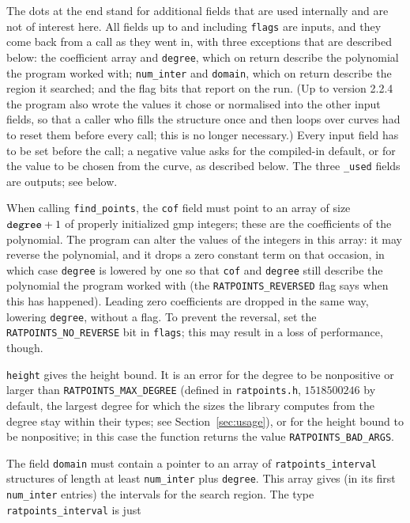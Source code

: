 \documentclass[12pt,a4paper,oneside]{amsart}
\begin{document}
The dots at the end stand for additional fields that are used internally
and are not of interest here. All fields up to and including \texttt{flags}
are inputs, and they come back from a call as they went in, with three
exceptions that are described below: the coefficient array and
\texttt{degree}, which on return describe the polynomial the program
worked with; \texttt{num\_inter} and \texttt{domain}, which on return
describe the region it searched; and the flag bits that report on the
run. (Up to version 2.2.4 the program also wrote the values it chose or
normalised into the other input fields, so that a caller who fills the
structure once and then loops over curves had to reset them before every
call; this is no longer necessary.) Every input field has to be set before
the call; a negative value asks for the compiled-in default, or for the
value to be chosen from the curve, as described below.
The three \texttt{\_used} fields are outputs; see below.

When calling \texttt{find\_points}, the
\texttt{cof} field must point to an array of size $\text{\texttt{degree}} + 1$
of properly initialized gmp integers; these are the coefficients of
the polynomial. The program can alter the values of the integers in this
array: it may reverse the polynomial, and it drops a zero constant term
on that occasion, in which case \texttt{degree} is lowered by one so that
\texttt{cof} and \texttt{degree} still describe the polynomial the program
worked with (the \texttt{RATPOINTS\_REVERSED} flag says when this has
happened). Leading zero coefficients are dropped in the same way, lowering
\texttt{degree}, without a flag.
To prevent the reversal, set the \texttt{RATPOINTS\_NO\_REVERSE} bit
in \texttt{flags}; this may result in a loss of performance, though.

\texttt{height} gives the height bound. It is an error for the
degree to be nonpositive or larger than \texttt{RATPOINTS\_MAX\_DEGREE}
(defined in \texttt{ratpoints.h}, $1518500246$ by default, the largest
degree for which the sizes the library computes from the degree stay
within their types; see Section~\ref{sec:usage}), or for the height
bound to be nonpositive; in this case the function returns the value
\texttt{RATPOINTS\_BAD\_ARGS}.

The field \texttt{domain} must contain a pointer to an array of
\texttt{ratpoints\_interval} structures of length at least \texttt{num\_inter}
plus \texttt{degree}. This array gives (in its first \texttt{num\_inter} entries)
the intervals for the search region. The type \texttt{ratpoints\_interval}
is just
\end{document}
